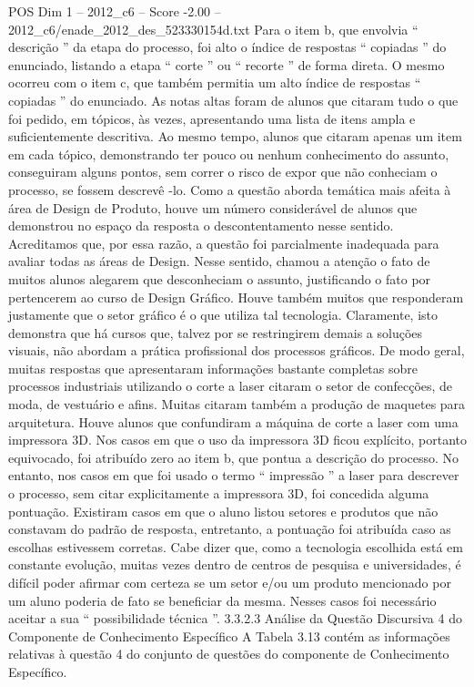 \begin{textsample}{POS Dim 1 – 2012\_c6 – Score -2.00 – 2012\_c6/enade\_2012\_des\_523330154d.txt}
Para o item b, que envolvia “ descrição ” da etapa do processo, foi alto o índice de respostas “ copiadas ” do enunciado, listando a etapa “ corte ” ou “ recorte ” de forma direta.
O mesmo ocorreu com o item c, que também permitia um alto índice de respostas “ copiadas ” do enunciado.
As notas altas foram de alunos que citaram tudo o que foi pedido, em tópicos, às vezes, apresentando uma lista de itens ampla e suficientemente descritiva.
Ao mesmo tempo, alunos que citaram apenas um item em cada tópico, demonstrando ter pouco ou nenhum conhecimento do assunto, conseguiram alguns pontos, sem correr o risco de expor que não conheciam o processo, se fossem descrevê -lo.
Como a questão aborda temática mais afeita à área de Design de Produto, houve um número considerável de alunos que demonstrou no espaço da resposta o descontentamento nesse sentido.
Acreditamos que, por essa razão, a questão foi parcialmente inadequada para avaliar todas as áreas de Design.
Nesse sentido, chamou a atenção o fato de muitos alunos alegarem que desconheciam o assunto, justificando o fato por pertencerem ao curso de Design Gráfico.
Houve também muitos que responderam justamente que o setor gráfico é o que utiliza tal tecnologia.
Claramente, isto demonstra que há cursos que, talvez por se restringirem demais a soluções visuais, não abordam a prática profissional dos processos gráficos.
De modo geral, muitas respostas que apresentaram informações bastante completas sobre processos industriais utilizando o corte a laser citaram o setor de confecções, de moda, de vestuário e afins.
Muitas citaram também a produção de maquetes para arquitetura.
Houve alunos que confundiram a máquina de corte a laser com uma impressora 3D.
Nos casos em que o uso da impressora 3D ficou explícito, portanto equivocado, foi atribuído zero ao item b, que pontua a descrição do processo.
No entanto, nos casos em que foi usado o termo “ impressão ” a laser para descrever o processo, sem citar explicitamente a impressora 3D, foi concedida alguma pontuação.
Existiram casos em que o aluno listou setores e produtos que não constavam do padrão de resposta, entretanto, a pontuação foi atribuída caso as escolhas estivessem corretas.
Cabe dizer que, como a tecnologia escolhida está em constante evolução, muitas vezes dentro de centros de pesquisa e universidades, é difícil poder afirmar com certeza se um setor e/ou um produto mencionado por um aluno poderia de fato se beneficiar da mesma.
Nesses casos foi necessário aceitar a sua “ possibilidade técnica ”. 3.3.2.3 Análise da Questão Discursiva 4 do Componente de Conhecimento Específico A Tabela 3.13 contém as informações relativas à questão 4 do conjunto de questões do componente de Conhecimento Específico.

\end{textsample}
